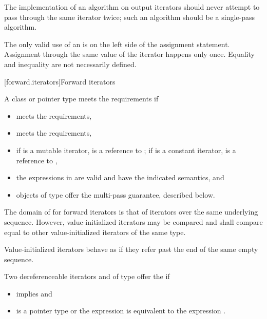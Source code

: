 \pnum
\recommended
The implementation of an algorithm on output iterators
should never attempt to pass through the same iterator twice;
such an algorithm should be a single-pass algorithm.
\begin{note}
The only valid use of an 
is on the left side of the assignment statement.
Assignment through the same value of the iterator happens only once.
Equality and inequality are not necessarily defined.
\end{note}

[forward.iterators]{Forward iterators}

\pnum
A class or pointer type
meets the  requirements if
\begin{itemize}
\item {} meets the  requirements,

\item {} meets the 
requirements,

\item if  is a mutable iterator,  is a reference to ;
if  is a constant iterator,  is a reference to ,

\item the expressions in 
are valid and have the indicated semantics, and

\item objects of type  offer the multi-pass guarantee, described below.
\end{itemize}

\pnum
The domain of \tcode{==} for forward iterators is that of iterators over the same
underlying sequence. However, value-initialized iterators may be compared and
shall compare equal to other value-initialized iterators of the same type.
\begin{note}
Value-initialized iterators behave as if they refer past the end of
the same empty sequence.
\end{note}

\pnum
Two dereferenceable iterators  and  of type  offer the
 if
\begin{itemize}
\item {} implies  and
\item {} is a pointer type or the expression
 is equivalent to the expression .
\end{itemize}

